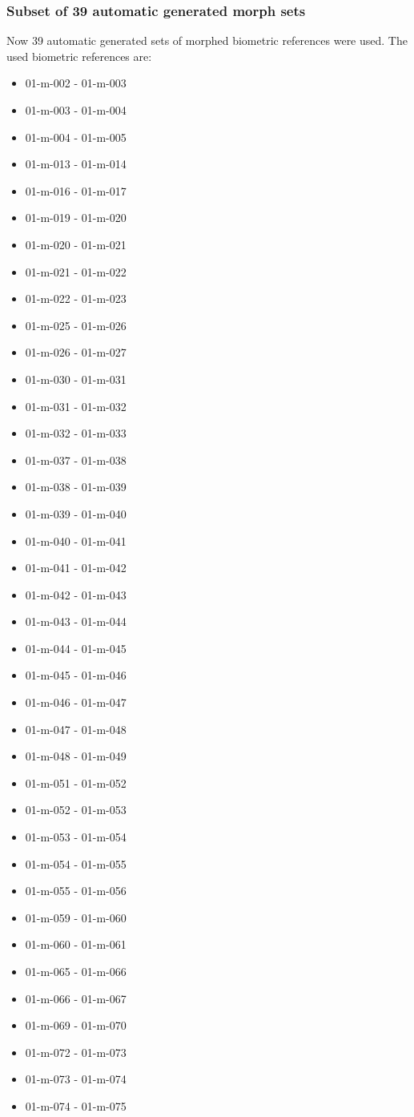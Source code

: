 \subsubsection{Subset of 39 automatic generated morph sets}\label{sec:subset39}
Now 39 automatic generated sets of morphed biometric references were used. The used biometric references are:
\begin{multicols}{3}
\begin{itemize}
\item 01-m-002 - 01-m-003
\item 01-m-003 - 01-m-004
\item 01-m-004 - 01-m-005
\item 01-m-013 - 01-m-014
\item 01-m-016 - 01-m-017
\item 01-m-019 - 01-m-020
\item 01-m-020 - 01-m-021
\item 01-m-021 - 01-m-022
\item 01-m-022 - 01-m-023
\item 01-m-025 - 01-m-026
\item 01-m-026 - 01-m-027
\item 01-m-030 - 01-m-031
\item 01-m-031 - 01-m-032
\item 01-m-032 - 01-m-033
\item 01-m-037 - 01-m-038
\item 01-m-038 - 01-m-039
\item 01-m-039 - 01-m-040
\item 01-m-040 - 01-m-041
\item 01-m-041 - 01-m-042
\item 01-m-042 - 01-m-043
\item 01-m-043 - 01-m-044
\item 01-m-044 - 01-m-045
\item 01-m-045 - 01-m-046
\item 01-m-046 - 01-m-047
\item 01-m-047 - 01-m-048
\item 01-m-048 - 01-m-049
\item 01-m-051 - 01-m-052
\item 01-m-052 - 01-m-053
\item 01-m-053 - 01-m-054
\item 01-m-054 - 01-m-055
\item 01-m-055 - 01-m-056
\item 01-m-059 - 01-m-060
\item 01-m-060 - 01-m-061
\item 01-m-065 - 01-m-066
\item 01-m-066 - 01-m-067
\item 01-m-069 - 01-m-070
\item 01-m-072 - 01-m-073
\item 01-m-073 - 01-m-074
\item 01-m-074 - 01-m-075
\end{itemize}
\end{multicols}


